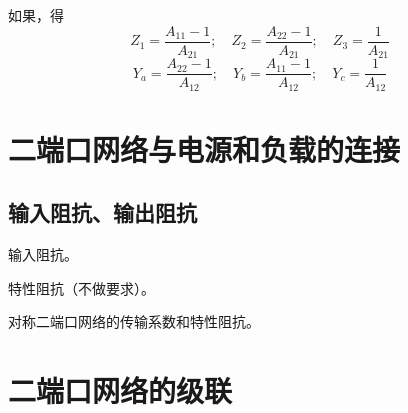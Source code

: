 如果，得
\[
Z_1=\frac{A_{11}-1}{A_{21}};\quad
Z_2=\frac{A_{22}-1}{A_{21}};\quad
Z_3=\frac{1}{A_{21}}
\]
\[
Y_a=\frac{A_{22}-1}{A_{12}};\quad
Y_b=\frac{A_{11}-1}{A_{12}};\quad
Y_c=\frac{1}{A_{12}}
\]


\section{二端口网络与电源和负载的连接}
\subsection{输入阻抗、输出阻抗}
输入阻抗。

特性阻抗（不做要求）。


对称二端口网络的传输系数和特性阻抗。

\section{二端口网络的级联}

\endinput
